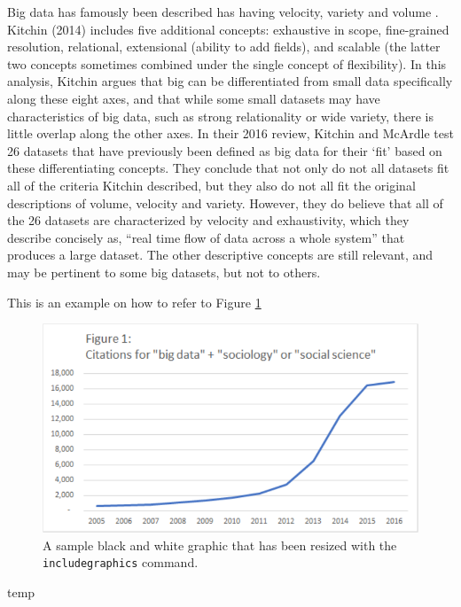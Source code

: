 \documentclass[sigconf]{acmart}
\begin{document}
Big data has famously been described has having velocity, variety and volume \cite{kitchin14}.  Kitchin (2014) includes five additional concepts: exhaustive in scope, fine-grained resolution, relational, extensional (ability to add fields), and scalable (the latter two concepts sometimes combined under the single concept of flexibility).  In this analysis, Kitchin argues that big can be differentiated from small data specifically along these eight axes, and that while some small datasets may have characteristics of big data, such as strong relationality or wide variety, there is little overlap along the other axes.  In their 2016 review, Kitchin and McArdle test 26 datasets that have previously been defined as big data for their ‘fit’ based on these differentiating concepts.  They conclude that not only do not all datasets fit all of the criteria Kitchin described, but they also do not all fit the original descriptions of volume, velocity and variety.  However, they do believe that all of the 26 datasets are characterized by velocity and exhaustivity, which they describe concisely as, “real time flow of data across a whole system” that produces a large dataset.  The other descriptive concepts are still relevant, and may be pertinent to some big datasets, but not to others.

This is an example on how to refer to Figure \ref{f:figure1}

\begin{figure}
\includegraphics[width=\columnwidth]{images/figure1}
\caption{A sample black and white graphic
that has been resized with the \texttt{includegraphics} command.}
\label{f:figure1}
\end{figure}




\begin{acks}

  temp

\end{acks}


 
\end{document}

